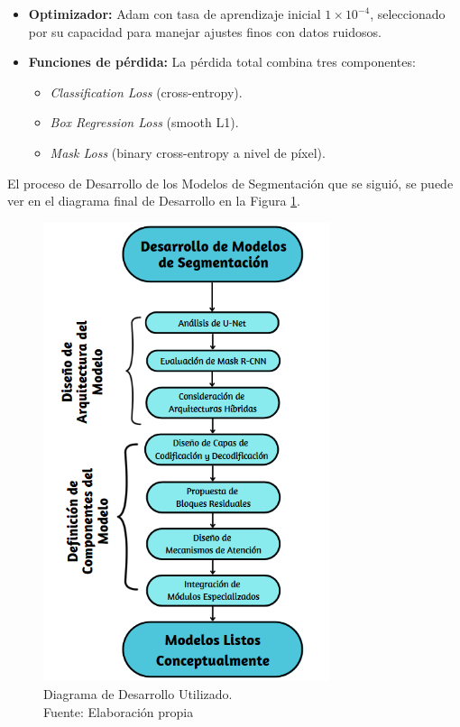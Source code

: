 \begin{enumerate}
\begin{itemize}
\begin{itemize}
    \item \textbf{Optimizador:} Adam con tasa de aprendizaje inicial $1 \times 10^{-4}$, seleccionado por su capacidad para manejar ajustes finos con datos ruidosos.
    
    \item \textbf{Funciones de pérdida:} La pérdida total combina tres componentes: 
    \begin{itemize}
        \item \textit{Classification Loss} (cross-entropy).
        \item \textit{Box Regression Loss} (smooth L1).
        \item \textit{Mask Loss} (binary cross-entropy a nivel de píxel).
    \end{itemize}
\end{itemize}

  \end{itemize}
\end{enumerate}


El proceso de Desarrollo de los Modelos de Segmentación que se siguió, se puede ver en el diagrama final de Desarrollo en la Figura \ref{4:figdesfin}.
\begin{figure}[h]
	\begin{center}
		\includegraphics[width=0.75\textwidth]{4/figures/Diagrama de Desarrollo.png}
		\caption[Diagrama de Desarrollo Utilizado]{Diagrama de Desarrollo Utilizado.\\
		Fuente: Elaboración propia}
		\label{4:figdesfin}
	\end{center}
\end{figure}
\clearpage
\newpage

